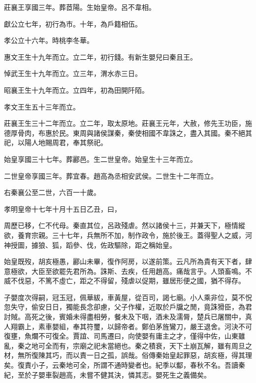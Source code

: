 莊襄王享國三年。葬茝陽。生始皇帝。呂不韋相。

獻公立七年，初行為市。十年，為戶籍相伍。

孝公立十六年。時桃李冬華。

惠文王生十九年而立。立二年，初行錢。有新生嬰兒曰秦且王。

悼武王生十九年而立。立三年，渭水赤三日。

昭襄王生十九年而立。立四年，初為田開阡陌。

孝文王生五十三年而立。

莊襄王生三十二年而立。立二年，取太原地。莊襄王元年，大赦，修先王功臣，施德厚骨肉，布惠於民。東周與諸侯謀秦，秦使相國不韋誅之，盡入其國。秦不絕其祀，以陽人地賜周君，奉其祭祀。

始皇享國三十七年。葬酈邑。生二世皇帝。始皇生十三年而立。

二世皇帝享國三年。葬宜春。趙高為丞相安武侯。二世生十二年而立。

右秦襄公至二世，六百一十歲。

孝明皇帝十七年十月十五日乙丑，曰，

周歷已移，仁不代母。秦直其位，呂政殘虐。然以諸侯十三，并兼天下，極情縱欲，養育宗親。三十七年，兵無所不加，制作政令，施於後王。蓋得聖人之威，河神授圖，據狼、狐，蹈參、伐，佐政驅除，距之稱始皇。

始皇既歿，胡亥極愚，酈山未畢，復作阿房，以遂前策。云凡所為貴有天下者，肆意極欲，大臣至欲罷先君所為。誅斯、去疾，任用趙高。痛哉言乎。人頭畜鳴。不威不伐惡，不篤不虛亡，距之不得留，殘虐以促期，雖居形便之國，猶不得存。

子嬰度次得嗣，冠玉冠，佩華紱，車黃屋，從百司，謁七廟。小人乘非位，莫不怳忽失守，偷安日日，獨能長念卻慮，父子作權，近取於戶牖之閒，竟誅猾臣，為君討賊。高死之後，賓婚未得盡相勞，餐未及下咽，酒未及濡脣，楚兵已屠關中，真人翔霸上，素車嬰組，奉其符璽，以歸帝者。鄭伯茅旌鸞刀，嚴王退舍。河決不可復壅，魚爛不可復全。賈誼、司馬遷曰，向使嬰有庸主之才，僅得中佐，山東雖亂，秦之地可全而有，宗廟之祀未當絕也。秦之積衰，天下土崩瓦解，雖有周旦之材，無所復陳其巧，而以責一日之孤，誤哉。俗傳秦始皇起罪惡，胡亥極，得其理矣。復責小子，云秦地可全，所謂不通時變者也。紀季以酅，春秋不名。吾讀秦紀，至於子嬰車裂趙高，未嘗不健其決，憐其志。嬰死生之義備矣。